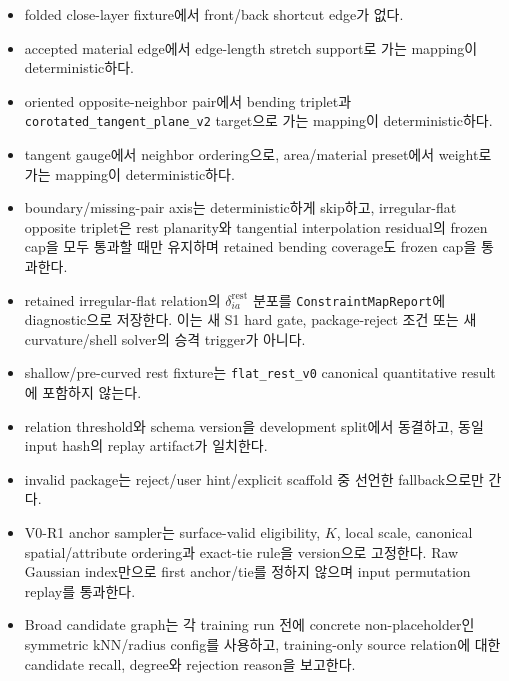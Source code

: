 \documentclass[10pt]{article}
\newcommand{\code}[1]{{\small\nolinkurl{#1}}}
\begin{document}
\begin{itemize}
  force/area clamp가 비활성이고 mass/energy floor와 epsilon이 함께 scale되거나 negligible인
  조건에서 \(M,C,K,\bar h,f_{\rm aero}\)의 공통 scaling과 trajectory/selector 불변성을 검사한다.
  Clamp가 작동하면 event rate를 별도 실패 신호로 기록하고 exact invariance를 주장하지 않는다.
  \item [\(\square\)] folded close-layer fixture에서 front/back shortcut edge가 없다.
  \item [\(\square\)] accepted material edge에서 edge-length stretch support로 가는 mapping이
  deterministic하다.
  \item [\(\square\)] oriented opposite-neighbor pair에서 bending triplet과
  \code{corotated\_tangent\_plane\_v2} target으로 가는 mapping이 deterministic하다.
  \item [\(\square\)] tangent gauge에서 neighbor ordering으로, area/material preset에서
  weight로 가는 mapping이 deterministic하다.
  \item [\(\square\)] boundary/missing-pair axis는 deterministic하게 skip하고,
  irregular-flat opposite triplet은 rest planarity와 tangential interpolation residual의
  frozen cap을 모두 통과할 때만 유지하며 retained bending coverage도 frozen cap을 통과한다.
  \item [\(\square\)] retained irregular-flat relation의 \(\delta_{ia}^{\mathrm{rest}}\) 분포를
  \code{ConstraintMapReport}에 diagnostic으로 저장한다. 이는 새 S1 hard gate, package-reject 조건 또는
  새 curvature/shell solver의 승격 trigger가 아니다.
  \item [\(\square\)] shallow/pre-curved rest fixture는 \code{flat\_rest\_v0}
  canonical quantitative result에 포함하지 않는다.
  \item [\(\square\)] relation threshold와 schema version을 development split에서 동결하고,
  동일 input hash의 replay artifact가 일치한다.
  \item [\(\square\)] invalid package는 reject/user hint/explicit scaffold 중 선언한 fallback으로만 간다.
  \item [\(\square\)] V0-R1 anchor sampler는 surface-valid eligibility, \(K\), local scale,
  canonical spatial/attribute ordering과 exact-tie rule을 version으로 고정한다.
  Raw Gaussian index만으로 first anchor/tie를 정하지 않으며 input permutation replay를 통과한다.
  \item [\(\square\)] Broad candidate graph는 각 training run 전에 concrete non-placeholder인
  symmetric kNN/radius config를 사용하고,
  training-only source relation에 대한 candidate recall, degree와 rejection reason을 보고한다.

\end{itemize}
\end{document}
